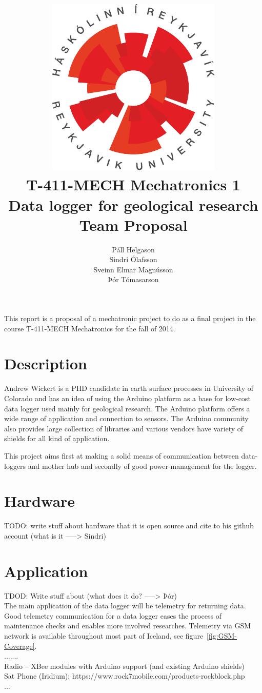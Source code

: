 \documentclass[12pt,a4paper,titlepage]{article}
\author{Páll Helgason\\Sindri Ólafsson\\Sveinn Elmar Magnússon\\Þór Tómasarson}  %
\title{\includegraphics{graphics/ru-logo}\\\vspace{10mm}
T-411-MECH Mechatronics 1\\Data logger for geological research\\Team Proposal}  %
\begin{document}
\maketitle  %
\onehalfspacing %

This report is a proposal of a mechatronic project to do as a
final project in the course T-411-MECH Mechatronics for the fall of 2014.
 

\section{Description}
Andrew Wickert is a PHD candidate in earth surface processes in University of Colorado and has an 
idea of using the Arduino platform as a base for low-cost data logger used mainly
for geological research. The Arduino platform offers a wide range of application and connection to 
sensors. The Arduino community also provides large collection of libraries and various vendors have 
variety of shields for all kind of application. 

This project aims first at making a solid means of communication between data-loggers and mother hub
and secondly of good power-management for the logger.

\section{Hardware} 
TODO: write stuff about hardware that it is open source and cite to his github account (what is it -----> Sindri)

\section{Application}
TDOD: Write stuff about  (what does it do? -----> Þór) \\
The main application of the data logger will be telemetry for returning data. Good telemetry communication for a data logger eases the process of maintenance checks and enables more involved researches. Telemetry via GSM network is available throughout most part of Iceland, see figure~\ref{fig:GSM-Coverage}.\\
.......\\
Radio -- XBee modules with Arduino support (and existing Arduino shields)\\
Sat Phone (Iridium): https://www.rock7mobile.com/products-rockblock.php\\
...\\
\end{document}
